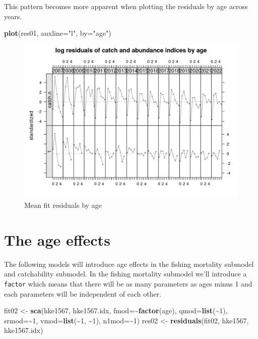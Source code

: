 \documentclass[
]{book}
\newenvironment{Shaded}{\begin{snugshade}}{\end{snugshade}}
\newcommand{\AttributeTok}[1]{\textcolor[rgb]{0.13,0.29,0.53}{#1}}
\newcommand{\DecValTok}[1]{\textcolor[rgb]{0.00,0.00,0.81}{#1}}
\newcommand{\FunctionTok}[1]{\textcolor[rgb]{0.13,0.29,0.53}{\textbf{#1}}}
\newcommand{\NormalTok}[1]{#1}
\newcommand{\OtherTok}[1]{\textcolor[rgb]{0.56,0.35,0.01}{#1}}
\newcommand{\SpecialCharTok}[1]{\textcolor[rgb]{0.81,0.36,0.00}{\textbf{#1}}}
\newcommand{\StringTok}[1]{\textcolor[rgb]{0.31,0.60,0.02}{#1}}
\begin{document}
This pattern becomes more apparent when plotting the residuals by age across years.

\begin{Shaded}
\begin{Highlighting}[]
\FunctionTok{plot}\NormalTok{(res01, }\AttributeTok{auxline=}\StringTok{"l"}\NormalTok{, }\AttributeTok{by=}\StringTok{"age"}\NormalTok{)}
\end{Highlighting}
\end{Shaded}

\begin{figure}
\centering
\includegraphics{_bookdown_files/_main_files/figure-html/meanresbyage-1.png}
\caption{\label{fig:meanresbyage}Mean fit residuals by age}
\end{figure}

\hypertarget{the-age-effects}{%
\section{The age effects}\label{the-age-effects}}

The following models will introduce age effects in the fishing mortality submodel and catchability submodel. In the fishing mortality submodel we'll introduce a \texttt{factor} which means that there will be as many parameters as ages minus 1 and each parameters will be independent of each other.

\begin{Shaded}
\begin{Highlighting}[]
\NormalTok{fit02 }\OtherTok{\textless{}{-}} \FunctionTok{sca}\NormalTok{(hke1567, hke1567.idx,}
    \AttributeTok{fmod=}\SpecialCharTok{\textasciitilde{}}\FunctionTok{factor}\NormalTok{(age),}
    \AttributeTok{qmod=}\FunctionTok{list}\NormalTok{(}\SpecialCharTok{\textasciitilde{}}\DecValTok{1}\NormalTok{),}
    \AttributeTok{srmod=}\SpecialCharTok{\textasciitilde{}}\DecValTok{1}\NormalTok{,}
    \AttributeTok{vmod=}\FunctionTok{list}\NormalTok{(}\SpecialCharTok{\textasciitilde{}}\DecValTok{1}\NormalTok{, }\SpecialCharTok{\textasciitilde{}}\DecValTok{1}\NormalTok{),}
    \AttributeTok{n1mod=}\SpecialCharTok{\textasciitilde{}}\DecValTok{1}\NormalTok{)}
\NormalTok{res02 }\OtherTok{\textless{}{-}} \FunctionTok{residuals}\NormalTok{(fit02, hke1567, hke1567.idx)}
\end{Highlighting}
\end{Shaded}
\end{document}
